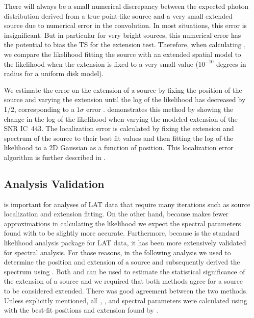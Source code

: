 There will always be a small numerical discrepancy between the expected
photon distribution derived from a true point-like source and a very small
extended source due to numerical error in the convolution.  In most
situations, this error is insignificant.  But in particular for
very bright sources, this numerical error has the potential to bias the
TS for the extension test. Therefore, when calculating
\tsext, we compare the likelihood fitting the source with an extended
spatial model to the likelihood when the extension is
fixed to a very small value ($10^{-10}$ degrees in radius 
for a uniform disk model).

We estimate the error on the extension of a source by fixing
the position of the source and varying the extension until the
log of the likelihood has decreased by 1/2, corresponding to a $1\sigma$ error
\citep{eadie_1971a_statistical-methods}.  
demonstrates this method by showing the change in the log of the
likelihood when 
varying the modeled extension of the SNR IC~443.  The localization
error is calculated by fixing the extension and spectrum of the source
to their best fit values and then
fitting the log of the likelihood to
a 2D Gaussian as a function
of position. This localization error algorithm is further described in
\cite{nolan_2012_fermi-large}.

\subsection{\gtlike Analysis Validation}

\pointlike is important for analyses of LAT data that require many iterations
such as source localization and extension fitting.  On the other hand,
because \gtlike makes fewer approximations in calculating the likelihood
we expect the spectral parameters found with \gtlike to be slightly more
accurate.  Furthermore, because \gtlike is the 
standard likelihood analysis package for LAT data, 
it has been more extensively validated for spectral analysis.
For those reasons, in the following analysis we used \pointlike to
determine the position and extension of a source and subsequently derived
the spectrum using \gtlike. Both \gtlike and \pointlike can be used to
estimate the statistical significance of the extension of a source and we
required that both methods agree for a source to be considered extended.
There was good agreement between the two methods.  Unless explicitly
mentioned, all \ts, \tsext, and spectral parameters were calculated using
\gtlike with the best-fit positions and extension found by \pointlike.



